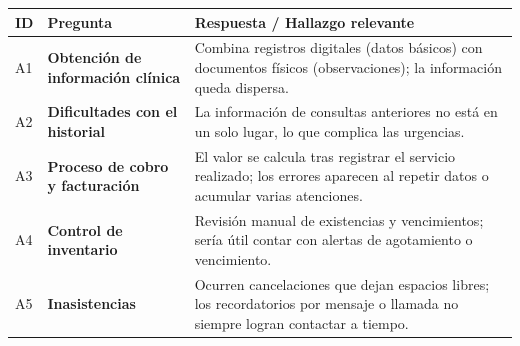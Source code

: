 \documentclass[
]{article}
\newcounter{none} %
\begin{document}
{\def\LTcaptype{none} %
\begin{longtable}[]{|
  >{\centering\arraybackslash}p{}|
  >{\raggedright\arraybackslash}p{}|
  >{\raggedright\arraybackslash}p{}|}
\hline
\begin{minipage}[b]{\linewidth}\centering
\textbf{ID}
\end{minipage} & \begin{minipage}[b]{\linewidth}\centering
\textbf{Pregunta}
\end{minipage} & \begin{minipage}[b]{\linewidth}\raggedright
\textbf{Respuesta / Hallazgo relevante}
\end{minipage} \\
\hline
\endhead
\hline
\endlastfoot
A1 & \textbf{Obtención de información clínica} &
\begin{minipage}[t]{\linewidth}\raggedright
Combina registros digitales (datos básicos) con documentos físicos (observaciones); la información queda dispersa.
\end{minipage} \\
\hline
A2 & \textbf{Dificultades con el historial} &
\begin{minipage}[t]{\linewidth}\raggedright
La información de consultas anteriores no está en un solo lugar, lo que complica las urgencias.
\end{minipage} \\
\hline
A3 & \textbf{Proceso de cobro y facturación} &
\begin{minipage}[t]{\linewidth}\raggedright
El valor se calcula tras registrar el servicio realizado; los errores aparecen al repetir datos o acumular varias atenciones.
\end{minipage} \\
\hline
A4 & \textbf{Control de inventario} &
\begin{minipage}[t]{\linewidth}\raggedright
Revisión manual de existencias y vencimientos; sería útil contar con alertas de agotamiento o vencimiento.
\end{minipage} \\
\hline
A5 & \textbf{Inasistencias} &
\begin{minipage}[t]{\linewidth}\raggedright
Ocurren cancelaciones que dejan espacios libres; los recordatorios por mensaje o llamada no siempre logran contactar a tiempo.
\end{minipage} \\

\end{longtable}}
\end{document}
